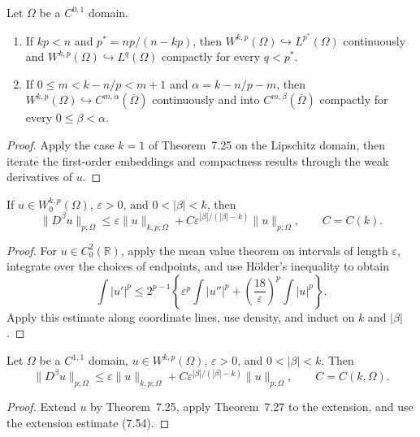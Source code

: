 \begin{theorem}
\label{gt:thm-sobolev-general-embedding}
Let $\Omega$ be a $C^{0,1}$ domain.
\begin{enumerate}
\item If $kp<n$ and $p^*=np/(n-kp)$, then
$W^{k,p}(\Omega)\hookrightarrow L^{p^*}(\Omega)$ continuously and
$W^{k,p}(\Omega)\hookrightarrow L^q(\Omega)$ compactly for every $q<p^*$.
\item If $0\leq m<k-n/p<m+1$ and $\alpha=k-n/p-m$, then
$W^{k,p}(\Omega)\hookrightarrow C^{m,\alpha}(\overline\Omega)$ continuously
and into $C^{m,\beta}(\overline\Omega)$ compactly for every
$0\leq\beta<\alpha$.
\end{enumerate}
\end{theorem}
\begin{proof}
\sketch Apply the case $k=1$ of Theorem~7.25 on the Lipschitz domain, then
iterate the first-order embeddings and compactness results through the weak
derivatives of $u$.
\end{proof}

\begin{theorem}[Interpolation on $W_0^{k,p}$]
\label{gt:thm-sobolev-interpolation-zero}
If $u\in W_0^{k,p}(\Omega)$, $\varepsilon>0$, and $0<|\beta|<k$, then
\begin{equation}
\tag{7.59}
\|D^\beta u\|_{p;\Omega}
\leq\varepsilon\|u\|_{k,p;\Omega}
+C\varepsilon^{|\beta|/(|\beta|-k)}\|u\|_{p;\Omega},
\qquad C=C(k).
\end{equation}
\end{theorem}
\begin{proof}
\sketch For $u\in C_0^2(\mathbb R)$, apply the mean value theorem on
intervals of length $\varepsilon$, integrate over the choices of endpoints,
and use H\"older's inequality to obtain
\begin{equation}
\tag{7.60}
\int|u'|^p\leq2^{p-1}\left\{
\varepsilon^p\int|u''|^p+
\left(\frac{18}{\varepsilon}\right)^p\int|u|^p\right\}.
\end{equation}
Apply this estimate along coordinate lines, use density, and induct on
$k$ and $|\beta|$.
\end{proof}

\begin{theorem}
\label{gt:thm-sobolev-interpolation-domain}
Let $\Omega$ be a $C^{1,1}$ domain, $u\in W^{k,p}(\Omega)$,
$\varepsilon>0$, and $0<|\beta|<k$. Then
\begin{equation}
\tag{7.61}
\|D^\beta u\|_{p;\Omega}
\leq\varepsilon\|u\|_{k,p;\Omega}
+C\varepsilon^{|\beta|/(|\beta|-k)}\|u\|_{p;\Omega},
\qquad C=C(k,\Omega).
\end{equation}
\end{theorem}
\begin{proof}
\sketch Extend $u$ by Theorem~7.25, apply Theorem~7.27 to the extension, and
use the extension estimate (7.54).
\end{proof}
